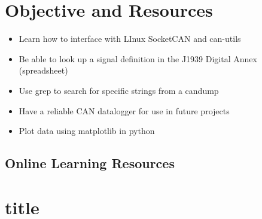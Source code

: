 \section{Objective and Resources}
	

	\begin{itemize}
		\item Learn how to interface with LInux SocketCAN and can-utils
		
		\item Be able to look up a signal definition in the J1939 Digital Annex (spreadsheet)
		
		\item Use grep to search for specific strings from a candump
		
		\item Have a reliable CAN datalogger for use in future projects
		
		\item Plot data using matplotlib in python

	\end{itemize}
	\subsection{Online Learning Resources}


\section{title}